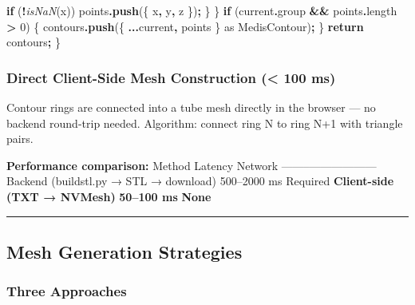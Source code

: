 \documentclass[
  11pt,
]{article}
\newenvironment{Shaded}{\begin{snugshade}}{\end{snugshade}}
\newcommand{\AttributeTok}[1]{\textcolor[rgb]{0.13,0.29,0.53}{#1}}
\newcommand{\ControlFlowTok}[1]{\textcolor[rgb]{0.13,0.29,0.53}{\textbf{#1}}}
\newcommand{\DecValTok}[1]{\textcolor[rgb]{0.00,0.00,0.81}{#1}}
\newcommand{\FunctionTok}[1]{\textcolor[rgb]{0.13,0.29,0.53}{\textbf{#1}}}
\newcommand{\ImportTok}[1]{#1}
\newcommand{\NormalTok}[1]{#1}
\newcommand{\OperatorTok}[1]{\textcolor[rgb]{0.81,0.36,0.00}{\textbf{#1}}}
\newcommand{\PreprocessorTok}[1]{\textcolor[rgb]{0.56,0.35,0.01}{\textit{#1}}}
\begin{document}
\begin{Shaded}
\begin{Highlighting}[]
      \ControlFlowTok{if}\NormalTok{ (}\OperatorTok{!}\PreprocessorTok{isNaN}\NormalTok{(x)) points}\OperatorTok{.}\FunctionTok{push}\NormalTok{(\{ x}\OperatorTok{,}\NormalTok{ y}\OperatorTok{,}\NormalTok{ z \})}\OperatorTok{;}
\NormalTok{    \}}
\NormalTok{  \}}
  \ControlFlowTok{if}\NormalTok{ (current}\OperatorTok{.}\AttributeTok{group} \OperatorTok{\&\&}\NormalTok{ points}\OperatorTok{.}\AttributeTok{length} \OperatorTok{\textgreater{}} \DecValTok{0}\NormalTok{) \{}
\NormalTok{    contours}\OperatorTok{.}\FunctionTok{push}\NormalTok{(\{ }\OperatorTok{...}\NormalTok{current}\OperatorTok{,}\NormalTok{ points \} }\ImportTok{as}\NormalTok{ MedisContour)}\OperatorTok{;}
\NormalTok{  \}}
  \ControlFlowTok{return}\NormalTok{ contours}\OperatorTok{;}
\NormalTok{\}}
\end{Highlighting}
\end{Shaded}

\subsubsection{Direct Client-Side Mesh Construction (\textless{} 100
ms)}\label{direct-client-side-mesh-construction-100-ms}

Contour rings are connected into a tube mesh directly in the browser ---
no backend round-trip needed. Algorithm: connect ring N to ring N+1 with
triangle pairs.

\textbf{Performance comparison:} \textbar{} Method \textbar{} Latency
\textbar{} Network \textbar{}
\textbar--------\textbar---------\textbar---------\textbar{} \textbar{}
Backend (buildstl.py → STL → download) \textbar{} 500--2000 ms
\textbar{} Required \textbar{} \textbar{} \textbf{Client-side (TXT →
NVMesh)} \textbar{} \textbf{50--100 ms} \textbar{} \textbf{None}
\textbar{}

\begin{center}\rule{0.5\linewidth}{0.5pt}\end{center}

\subsection{Mesh Generation
Strategies}\label{mesh-generation-strategies}

\subsubsection{Three Approaches}\label{three-approaches}
\end{document}
